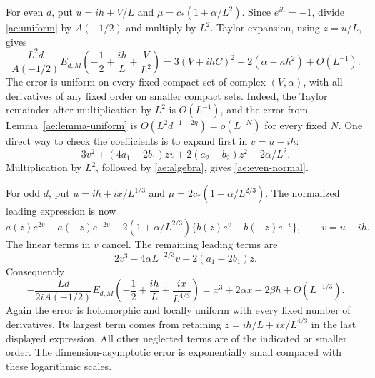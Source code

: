 For even $d$, put $u=ih+V/L$ and
$\mu=c_*(1+\alpha/L^2)$. Since $e^{ih}=-1$, divide
\eqref{ae:uniform} by $A(-1/2)$ and multiply by $L^2$.
Taylor expansion, using $z=u/L$, gives
\begin{equation}\label{ae:even-normal}
 \frac{L^2d}{A(-1/2)}E_{d,M}
 \left(-\frac12+\frac{ih}{L}+\frac V{L^2}\right)
 =3(V+ihC)^2-2(\alpha-\kappa h^2)+O(L^{-1}).
\end{equation}
The error is uniform on every fixed compact set of complex $(V,\alpha)$,
with all derivatives of any fixed order on smaller compact sets. Indeed,
the Taylor remainder after multiplication by $L^2$ is $O(L^{-1})$,
and the error from Lemma~\ref{ae:lemma-uniform} is
$O(L^2d^{-1+2\eta})=o(L^{-N})$ for every fixed $N$.
One direct way to check the coefficients is to expand first in
$v=u-ih$:
\[
 3v^2+(4a_1-2b_1)zv+2(a_2-b_2)z^2-2\alpha/L^2.
\]
Multiplication by $L^2$, followed by \eqref{ae:algebra}, gives
\eqref{ae:even-normal}.

For odd $d$, put $u=ih+i x/L^{1/3}$ and
$\mu=2c_*(1+\alpha/L^{2/3})$. The normalized leading expression is now
\[
 a(z)e^{2v}-a(-z)e^{-2v}
 -2(1+\alpha/L^{2/3})\{b(z)e^v-b(-z)e^{-v}\},\qquad v=u-ih.
\]
The linear terms in $v$ cancel. The remaining leading terms are
\[
 2v^3-4\alpha L^{-2/3}v+2(a_1-2b_1)z.
\]
Consequently
\begin{equation}\label{ae:odd-normal}
 -\frac{Ld}{2iA(-1/2)}E_{d,M}
 \left(-\frac12+\frac{ih}{L}+\frac {ix}{L^{4/3}}\right)
 =x^3+2\alpha x-2\beta h+O(L^{-1/3}).
\end{equation}
Again the error is holomorphic and locally uniform with every fixed
number of derivatives. Its largest term comes from retaining
$z=ih/L+ix/L^{4/3}$ in the last displayed expression. All other neglected
terms are of the indicated or smaller order. The dimension-asymptotic
error is exponentially small compared with these logarithmic scales.

